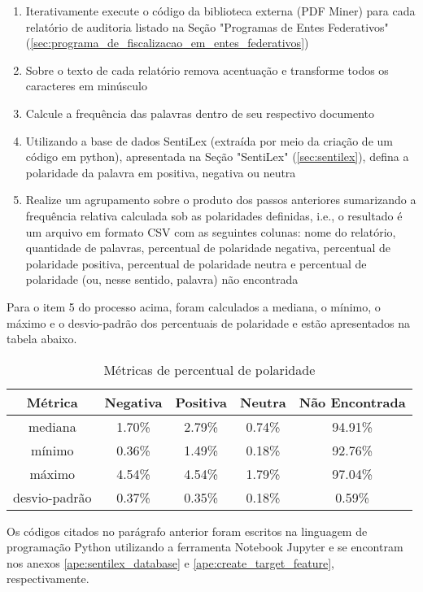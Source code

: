\begin{enumerate}
	\item Iterativamente execute o código da biblioteca externa (PDF Miner) para cada relatório de auditoria listado na Seção "Programas de Entes Federativos" (\ref{sec:programa_de_fiscalizacao_em_entes_federativos})
	\item Sobre o texto de cada relatório remova acentuação e transforme todos os caracteres em minúsculo
	\item Calcule a frequência das palavras dentro de seu respectivo documento
	\item Utilizando a base de dados SentiLex (extraída por meio da criação de um código em python), apresentada na Seção "SentiLex" (\ref{sec:sentilex}), defina a polaridade da palavra em positiva, negativa ou neutra
	\item Realize um agrupamento sobre o produto dos passos anteriores sumarizando a frequência relativa calculada sob as polaridades definidas, i.e., o resultado é um arquivo em formato CSV com as seguintes colunas: nome do relatório, quantidade de palavras, percentual de polaridade negativa, percentual de polaridade positiva, percentual de polaridade neutra e percentual de polaridade (ou, nesse sentido, palavra) não encontrada
\end{enumerate}

Para o item 5 do processo acima, foram calculados a mediana, o mínimo, o máximo e o desvio-padrão dos percentuais de polaridade e estão apresentados na tabela abaixo.

\begin{table}[h]
\centering
\caption{Métricas de percentual de polaridade}
\label{tab:cap2_analise_descritiva}
\begin{tabular}{ccccc}
Métrica & Negativa & Positiva & Neutra & Não Encontrada \\
\hline
mediana & 1.70\% & 2.79\% & 0.74\% & 94.91\% \\
mínimo & 0.36\% & 1.49\% & 0.18\% & 92.76\% \\
máximo & 4.54\% & 4.54\% & 1.79\% & 97.04\% \\
desvio-padrão & 0.37\% & 0.35\% & 0.18\% & 0.59\% \\
\hline
\end{tabular}
\end{table}
\FloatBarrier

Os códigos citados no parágrafo anterior foram escritos na linguagem de programação Python utilizando a ferramenta Notebook Jupyter e se encontram nos anexos \ref{ape:sentilex_database} e \ref{ape:create_target_feature}, respectivamente.

